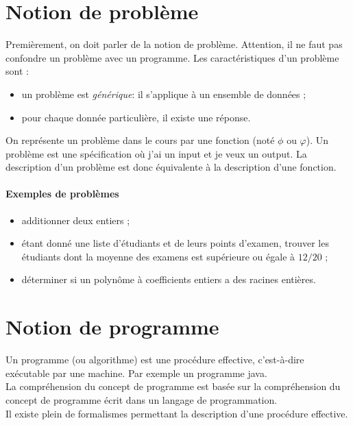 \section{Notion de problème}
\label{sec:notion_de_probleme}

Premièrement, on doit parler de la notion de problème.
Attention, il ne faut pas confondre un problème avec un programme.
Les caractéristiques d'un problème sont :

\begin{itemize}
	\item un problème est \emph{générique}: il s'applique à un ensemble de données ;
	\item pour chaque donnée particulière, il existe une réponse.
\end{itemize}

On représente un problème dans le cours par une fonction (noté $\phi$ ou $\varphi$).
Un problème est une spécification où j'ai un input et je veux un output.
La description d'un problème est donc équivalente à la description d'une fonction.

\paragraph{Exemples de problèmes}
\begin{itemize}
	\item additionner deux entiers ;
	\item étant donné une liste d'étudiants et de leurs points d'examen, trouver les étudiants dont la moyenne des examens est supérieure ou égale à $12/20$ ;
	\item déterminer si un polynôme à coefficients entiers a des racines entières.
\end{itemize}

\section{Notion de programme}
\label{sec:notion_de_programme}

Un programme (ou algorithme) est une \og procédure effective\fg, c'est-à-dire exécutable par une machine. Par exemple un programme java.\\

La compréhension du concept de programme est basée sur la compréhension du concept de \og programme écrit dans un langage de programmation\fg.\\

Il existe plein de formalismes permettant la description d'une \og procédure effective\fg.

